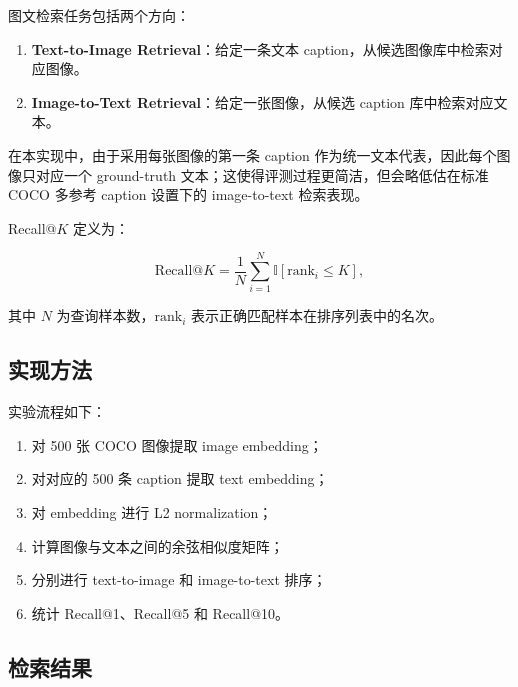 \documentclass[UTF8,a4paper,10pt]{ctexart}
\begin{document}
图文检索任务包括两个方向：

\begin{enumerate}
    \item \textbf{Text-to-Image Retrieval}：给定一条文本 caption，从候选图像库中检索对应图像。
    \item \textbf{Image-to-Text Retrieval}：给定一张图像，从候选 caption 库中检索对应文本。
\end{enumerate}

在本实现中，由于采用每张图像的第一条 caption 作为统一文本代表，因此每个图像只对应一个 ground-truth 文本；这使得评测过程更简洁，但会略低估在标准 COCO 多参考 caption 设置下的 image-to-text 检索表现。

Recall@$K$ 定义为：

\begin{equation}
\text{Recall@}K = \frac{1}{N} \sum_{i=1}^{N} \mathbb{I}[\text{rank}_i \le K],
\end{equation}

其中 $N$ 为查询样本数，$\text{rank}_i$ 表示正确匹配样本在排序列表中的名次。

\subsection{实现方法}

实验流程如下：

\begin{enumerate}
    \item 对 500 张 COCO 图像提取 image embedding；
    \item 对对应的 500 条 caption 提取 text embedding；
    \item 对 embedding 进行 L2 normalization；
    \item 计算图像与文本之间的余弦相似度矩阵；
    \item 分别进行 text-to-image 和 image-to-text 排序；
    \item 统计 Recall@1、Recall@5 和 Recall@10。
\end{enumerate}

\subsection{检索结果}
\end{document}

